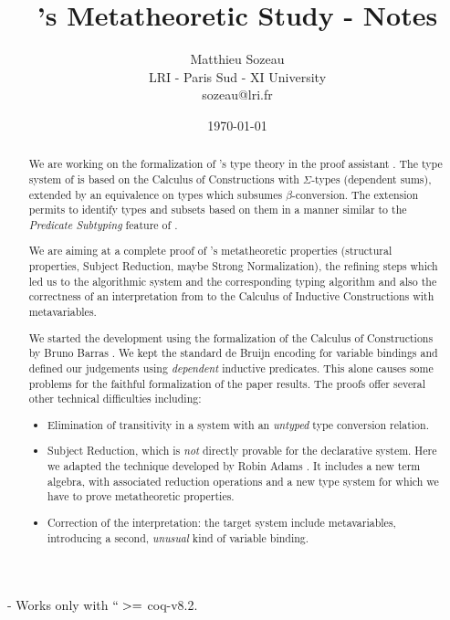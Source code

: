 \documentclass{article}
\title{\Russell's Metatheoretic Study - Notes}
\date{\today}
\author{Matthieu Sozeau \\
  LRI - Paris Sud - XI University \\
  sozeau@lri.fr}
\begin{document}
\maketitle
\begin{abstract}

We are working on the formalization of \Russell{}'s type theory in the
\Coq{} proof assistant \cite{sozeau:coq/Russell/meta}.  The type system
of \Russell{} is based on the Calculus of Constructions with
$\Sigma$-types (dependent sums), extended by an equivalence on types
which subsumes $\beta$-conversion. The extension permits to identify
types and subsets based on them in a manner similar to the
\emph{Predicate Subtyping} feature of \PVS{}.

We are aiming at a complete proof of \Russell{}'s metatheoretic properties
(structural properties, Subject Reduction, maybe Strong Normalization),
the refining steps which led us to the algorithmic system and the
corresponding typing algorithm and also the correctness of an interpretation
from \Russell{} to the Calculus of Inductive Constructions with
metavariables.

We started the development using the formalization of the Calculus of
Constructions by Bruno Barras \cite{Barras96a}.  We kept the standard de
Bruijn encoding for variable bindings and defined our judgements using
\emph{dependent} inductive predicates.  This alone causes some problems
for the faithful formalization of the paper results.  The proofs offer
several other technical difficulties including:
\begin{itemize}
\item Elimination of transitivity in a system with an \emph{untyped} type
  conversion relation.

\item Subject Reduction, which is \emph{not} directly provable for the
  declarative system. Here we adapted the technique developed by
  Robin Adams \cite{adams:PTSEQ}. It includes a new term algebra, with
  associated reduction operations and a new type system
  for which we have to prove metatheoretic properties.

\item Correction of the interpretation: the target system include
  metavariables, introducing a second, \emph{unusual} kind of variable binding.
\end{itemize}

\end{abstract}

- Works only with $``>=$ coq-v8.2.
\end{document}
